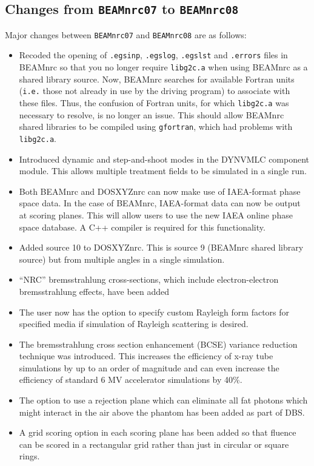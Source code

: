 \documentclass[12pt,twoside]{article}
\begin{document}
\subsection{Changes from {\tt BEAMnrc07} to {\tt BEAMnrc08}}

Major changes between {\tt BEAMnrc07} and {\tt BEAMnrc08} are
as follows:

\begin{itemize}

\item Recoded the opening of {\tt .egsinp}, {\tt .egslog},
{\tt .egslst} and {\tt .errors} files in BEAMnrc so that you no longer
require {\tt libg2c.a} when using BEAMnrc as a shared library source.
Now, BEAMnrc searches for available Fortran units ({\tt i.e.} those
not already in use by the driving program) to associate with these
files.  Thus, the confusion of Fortran units, for which {\tt libg2c.a}
was necessary to resolve, is no longer an issue.  This should allow
BEAMnrc shared libraries to be compiled using {\tt gfortran}, which
had problems with {\tt libg2c.a}.

\item Introduced dynamic and step-and-shoot modes in the DYNVMLC
component module.  This allows multiple treatment fields to be simulated
in a single run.

\item Both BEAMnrc and DOSXYZnrc can now make use of IAEA-format phase
space data.  In the case of BEAMnrc, IAEA-format data can now be output
at scoring planes.  This will allow users to use the new IAEA online phase
space database.  A C++ compiler is required for this functionality.

\item Added source 10 to DOSXYZnrc.  This is source 9 (BEAMnrc shared
library source) but from multiple angles in a single simulation.

\item ``NRC'' bremsstrahlung cross-sections, which include electron-electron
bremsstrahlung effects, have been added

\item  The user now has the option to specify custom Rayleigh form factors
for specified media if simulation of Rayleigh scattering is desired.

\item The bremsstrahlung cross section enhancement (BCSE) variance reduction
technique was introduced.  This increases the efficiency of x-ray tube
simulations by up to an order of magnitude and can even increase the
efficiency of standard 6 MV accelerator simulations by 40\%.

\item The option to use a rejection plane which can eliminate all fat
photons which might interact in the air above the phantom has been added as
part of DBS.

\item A grid scoring option in each scoring plane has been added so that
fluence can be scored in a rectangular grid rather than just in circular or
square rings.

\end{itemize}
\end{document}
